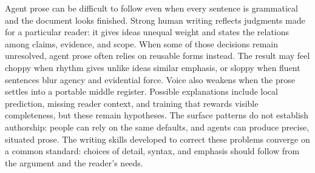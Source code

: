 Agent prose can be difficult to follow even when every sentence is grammatical
and the document looks finished. Strong human writing reflects judgments made
for a particular reader: it gives ideas unequal weight and states the
relations among claims, evidence, and scope. When some of those decisions
remain unresolved, agent prose often relies on reusable forms instead. The
result may feel choppy when rhythm gives unlike ideas similar emphasis, or
sloppy when fluent sentences blur agency and evidential force. Voice also
weakens when the prose settles into a portable middle register. Possible
explanations include local prediction, missing reader context, and training
that rewards visible completeness, but these remain hypotheses. The surface
patterns do not establish authorship: people can rely on the same defaults, and
agents can produce precise, situated prose. The writing skills developed to
correct these problems converge on a common standard: choices of detail,
syntax, and emphasis should follow from the argument and the reader's needs.
